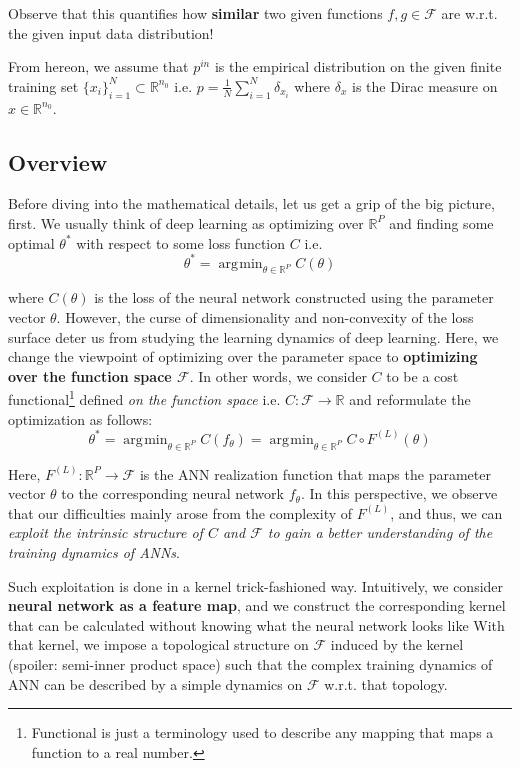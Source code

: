 \documentclass{article}
\theoremstyle{plain}
\theoremstyle{definition}
\theoremstyle{remark}
\DeclareMathOperator*{\argmin}{\arg\!\min}
\begin{document}
Observe that this quantifies how {\bf similar} two given functions $f, g \in \mathcal{F}$ are w.r.t. the given input data distribution!

From hereon, we assume that $p^{in}$ is the empirical distribution on the given finite training set $\{x_i\}_{i=1}^N \subset \mathbb{R}^{n_0}$ i.e. $p = \frac{1}{N} \sum_{i=1}^N \delta_{x_i}$ where $\delta_x$ is the Dirac measure on $x \in \mathbb{R}^{n_0}$.


\subsection{Overview}
Before diving into the mathematical details, let us get a grip of the big picture, first.
We usually think of deep learning as optimizing over $\mathbb{R}^P$ and finding some optimal $\theta^*$ with respect to some loss function $C$ i.e.
\begin{equation}
	\theta^* = \argmin_{\theta \in \mathbb{R}^P} C(\theta)
\end{equation}

where $C(\theta)$ is the loss of the neural network constructed using the parameter vector $\theta$.
However, the curse of dimensionality and non-convexity of the loss surface deter us from studying the learning dynamics of deep learning.
Here, we change the viewpoint of optimizing over the parameter space to {\bf optimizing over the function space $\mathcal{F}$}.
In other words, we consider $C$ to be a cost functional\footnote{Functional is just a terminology used to describe any mapping that maps a function to a real number.} defined {\it on the function space} i.e. $C : \mathcal{F} \rightarrow \mathbb{R}$ and reformulate the optimization as follows:
\begin{equation}
	\theta^* = \argmin_{\theta \in \mathbb{R}^P} C(f_\theta) = \argmin_{\theta \in \mathbb{R}^P} C \circ F^{(L)}(\theta)
\end{equation}

Here, $F^{(L)} : \mathbb{R}^P \rightarrow \mathcal{F}$ is the ANN realization function that maps the parameter vector $\theta$ to the corresponding neural network $f_\theta$.
In this perspective, we observe that our difficulties mainly arose from the complexity of $F^{(L)}$, and thus, we can {\it exploit the intrinsic structure of $C$ and $\mathcal{F}$ to gain a better understanding of the training dynamics of ANNs}.

Such exploitation is done in a kernel trick-fashioned way.
Intuitively, we consider {\bf neural network as a feature map}, and we construct the corresponding kernel that can be calculated without knowing what the neural network looks like
With that kernel, we impose a topological structure on $\mathcal{F}$ induced by the kernel (spoiler: semi-inner product space) such that the complex training dynamics of ANN can be described by a simple dynamics on $\mathcal{F}$ w.r.t. that topology.
\end{document}
